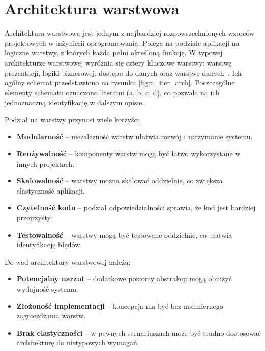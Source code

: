 \section{Architektura warstwowa}

Architektura warstwowa jest jednym z najbardziej rozpowszechnionych wzorców projektowych w inżynierii oprogramowania. Polega na podziale aplikacji na logiczne warstwy, z których każda pełni określoną funkcję. W typowej architekturze warstwowej wyróżnia się cztery kluczowe warstwy: warstwę prezentacji, logiki biznesowej, dostępu do danych oraz warstwę danych~\cite{n_tier_baeldung, n_tier_medium}. Ich ogólny schemat przedstawiono na rysunku \ref{fig:n_tier_arch}. Poszczególne elementy schematu oznaczono literami (a, b, c, d), co pozwala na ich jednoznaczną identyfikację w dalszym opisie.

Podział na warstwy przynosi wiele korzyści:
\begin{itemize}
    \item \textbf{Modularność} -- niezależność warstw ułatwia rozwój i utrzymanie systemu.
    \item \textbf{Reużywalność} -- komponenty warstw mogą być łatwo wykorzystane w innych projektach.
    \item \textbf{Skalowalność} -- warstwy można skalować oddzielnie, co zwiększa elastyczność aplikacji.
    \item \textbf{Czytelność kodu} -- podział odpowiedzialności sprawia, że kod jest bardziej przejrzysty.
    \item \textbf{Testowalność} -- warstwy mogą być testowane oddzielnie, co ułatwia identyfikację błędów.
\end{itemize}
Do wad architektury warstwowej należą:
\begin{itemize}
    \item \textbf{Potencjalny narzut} -- dodatkowe poziomy abstrakcji mogą obniżyć wydajność systemu.
    \item \textbf{Złożoność implementacji} -- koncepcja ma być bez nadmiernego zagnieżdżania warstw.
    \item \textbf{Brak elastyczności} -- w pewnych scenariuszach może być trudno dostosować architekturę do nietypowych wymagań.
\end{itemize}


